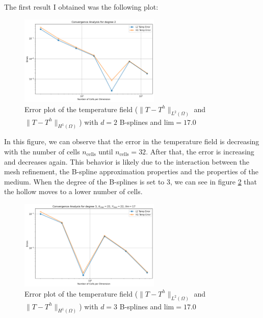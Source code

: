 \documentclass[a4paper,12pt,twoside]{report}
\begin{document}
The first result I obtained was the following plot:
\begin{figure}[!h]
	\centering
	\includegraphics[width=0.6\textwidth]{figures/figures_thermoelas/Temp_X_max=22_Y_max=22_lim=17.0_d=2.png}
	\caption{Error plot of the temperature field ($\|T - T^h\|_{L^2(\Omega)}$ and $\|T - T^h\|_{H^1(\Omega)}$) with $d=2$ B-splines and $\text{lim} = 17.0$}
	\label{fig:error_temp_d2}
\end{figure}

In this figure, we can observe that the error in the temperature field is decreasing with the number of cells $n_{\text{cells}}$ until $n_{\text{cells}} = 32$. After that, the error is increasing and decreases again. This behavior is likely due to the interaction between the mesh refinement, the B-spline approximation properties and the properties of the medium. When the degree of the B-splines is set to 3, we can see in figure \ref{fig:error_temp_d3} that the hollow moves to a lower number of cells.

\begin{figure}[!h]
	\centering
	\includegraphics[width=0.6\textwidth]{figures/figures_thermoelas/Temp_X_max=22_Y_max=22_lim=17_d=3.png}
	\caption{Error plot of the temperature field ($\|T - T^h\|_{L^2(\Omega)}$ and $\|T - T^h\|_{H^1(\Omega)}$) with $d=3$ B-splines and $\text{lim} = 17.0$}
	\label{fig:error_temp_d3}
\end{figure}
\end{document}
